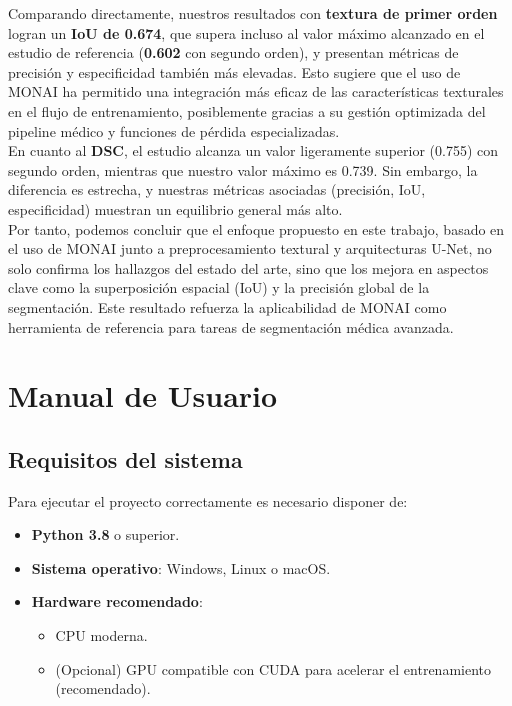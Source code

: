 \documentclass[12pt]{article}
\begin{document}
Comparando directamente, nuestros resultados con \textbf{textura de primer orden} logran un \textbf{IoU de 0.674}, que supera incluso al valor máximo alcanzado en el estudio de referencia (\textbf{0.602} con segundo orden), y presentan métricas de precisión y especificidad también más elevadas. Esto sugiere que el uso de MONAI ha permitido una integración más eficaz de las características texturales en el flujo de entrenamiento, posiblemente gracias a su gestión optimizada del pipeline médico y funciones de pérdida especializadas.
\\

En cuanto al \textbf{DSC}, el estudio alcanza un valor ligeramente superior (0.755) con segundo orden, mientras que nuestro valor máximo es 0.739. Sin embargo, la diferencia es estrecha, y nuestras métricas asociadas (precisión, IoU, especificidad) muestran un equilibrio general más alto.
\\

Por tanto, podemos concluir que el enfoque propuesto en este trabajo, basado en el uso de MONAI junto a preprocesamiento textural y arquitecturas U-Net, no solo confirma los hallazgos del estado del arte, sino que los mejora en aspectos clave como la superposición espacial (IoU) y la precisión global de la segmentación. Este resultado refuerza la aplicabilidad de MONAI como herramienta de referencia para tareas de segmentación médica avanzada.


\section{Manual de Usuario}
\subsection{Requisitos del sistema}
Para ejecutar el proyecto correctamente es necesario disponer de:

\begin{itemize}
    \item \textbf{Python 3.8} o superior.
    \item \textbf{Sistema operativo}: Windows, Linux o macOS.
    \item \textbf{Hardware recomendado}:
    \begin{itemize}
        \item CPU moderna.
        \item (Opcional) GPU compatible con CUDA para acelerar el entrenamiento (recomendado).
    \end{itemize}
\end{itemize}
\end{document}
